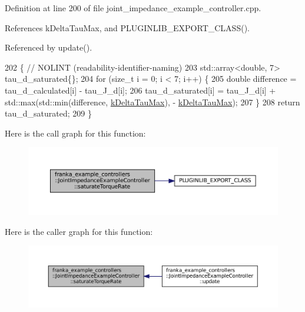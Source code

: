 Definition at line 200 of file joint\+\_\+impedance\+\_\+example\+\_\+controller.\+cpp.



References k\+Delta\+Tau\+Max, and P\+L\+U\+G\+I\+N\+L\+I\+B\+\_\+\+E\+X\+P\+O\+R\+T\+\_\+\+C\+L\+A\+S\+S().



Referenced by update().


\begin{DoxyCode}
202                                         \{  \textcolor{comment}{// NOLINT (readability-identifier-naming)}
203   std::array<double, 7> tau\_d\_saturated\{\};
204   \textcolor{keywordflow}{for} (\textcolor{keywordtype}{size\_t} i = 0; i < 7; i++) \{
205     \textcolor{keywordtype}{double} difference = tau\_d\_calculated[i] - tau\_J\_d[i];
206     tau\_d\_saturated[i] = tau\_J\_d[i] + std::max(std::min(difference, \hyperlink{classfranka__example__controllers_1_1JointImpedanceExampleController_a0dc22a8d2121a79f7583444207cb724d}{kDeltaTauMax}), -
      \hyperlink{classfranka__example__controllers_1_1JointImpedanceExampleController_a0dc22a8d2121a79f7583444207cb724d}{kDeltaTauMax});
207   \}
208   \textcolor{keywordflow}{return} tau\_d\_saturated;
209 \}
\end{DoxyCode}
Here is the call graph for this function\+:
\nopagebreak
\begin{figure}[H]
\begin{center}
\leavevmode
\includegraphics[width=350pt]{classfranka__example__controllers_1_1JointImpedanceExampleController_a246799d505d7ebedb1c75d8e9f251a01_cgraph}
\end{center}
\end{figure}
Here is the caller graph for this function\+:
\nopagebreak
\begin{figure}[H]
\begin{center}
\leavevmode
\includegraphics[width=350pt]{classfranka__example__controllers_1_1JointImpedanceExampleController_a246799d505d7ebedb1c75d8e9f251a01_icgraph}
\end{center}
\end{figure}
